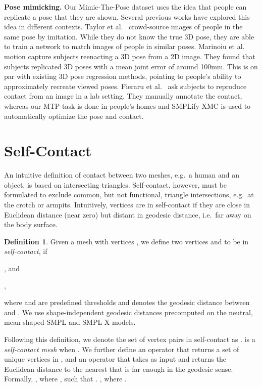 \documentclass[final]{cvpr}
\newcommand{\smplifyxmc}{\mbox{SMPLify-XMC}\xspace}
\theoremstyle{definition}
\newtheorem{definition}{Definition}[section]
\begin{document}
{\bf Pose mimicking.}
Our Mimic-The-Pose dataset uses the idea that people can replicate a pose that they are shown.
Several previous works have explored this idea in different contexts.
Taylor et al.~\cite{taylor2011learning} crowd-source images of people in the same pose by imitation.  
While they do not know the true 3D pose, they are able to train a network to match images of  people in similar poses.
Marinoiu et al.~\cite{marinoiu2013pictorial} motion capture subjects reenacting a 3D pose from a 2D image.
They found that subjects replicated 3D poses with a mean joint error of around 100mm.
This is on par with existing 3D pose regression methods, pointing to people's ability to approximately recreate viewed poses.
Fieraru et al.~\cite{Fieraru_2021_AAAI} 
ask subjects to reproduce contact from an image
in a lab setting.
They manually annotate the contact, whereas our MTP task is done in people's homes and \smplifyxmc is used to automatically optimize the pose and contact.

 	\section{Self-Contact}
\label{subsection:Contact}
An intuitive definition of contact between two meshes, e.g.~a human and an object, is based on intersecting triangles. Self-contact, however, must be formulated to exclude common, but not functional, triangle intersections, e.g.~at the crotch or armpits. 
Intuitively, vertices are in self-contact if they are close in Euclidean distance (near zero) but distant in geodesic distance, i.e.~far away on the body surface.
\begin{definition}
	\label{definition-selfcontact}
	Given a mesh  with vertices , we define two vertices  and   to be in \textit{self-contact}, if \begin{enumerate*}[label=(\roman*)] \item , and \item ,\end{enumerate*} where  and  are predefined thresholds and  denotes the geodesic distance between  and . We use shape-independent geodesic distances precomputed on the neutral, mean-shaped SMPL and SMPL-X models.  
\end{definition}

Following this definition, we denote the set of vertex pairs in self-contact as .   is a \textit{self-contact mesh} when . We further define an operator  that returns a set of unique vertices in , and an operator  that takes  as input and returns the Euclidean distance to the nearest  that is far enough in the geodesic sense. 
Formally, , where , such that . , where .
\end{document}
